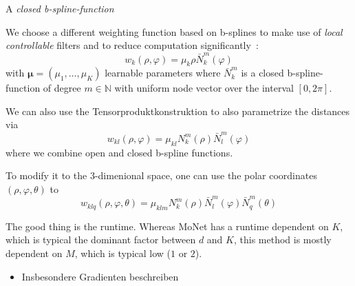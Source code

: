 \documentclass[pdftex,10pt,a4paper]{scrartcl}
\begin{document}
A \emph{closed b-spline-function}

We choose a different weighting function based on b-splines to make use of \emph{local controllable} filters and to reduce computation significantly~\cite{Fey2017}:
\begin{equation*}
  w_k(\rho, \varphi) = \mu_k \rho \bar{N}_k^m(\varphi)
\end{equation*}
with $\boldsymbol{\mu} = (\mu_1, \ldots, \mu_K )$ learnable parameters where $\bar{N}_k^m$ is a closed b-spline-function of degree $m \in \mathbb{N}$ with uniform node vector over the interval $[0, 2\pi]$.

We can also use the Tensorproduktkonstruktion to also parametrize the distances via
\begin{equation*}
  w_{kl}(\rho, \varphi) = \mu_{kl} N_k^m(\rho) \bar{N}_l^m(\varphi)
\end{equation*}
where we combine open and closed b-spline functions.

To modify it to the 3-dimenional space, one can use the polar coordinates $(\rho, \varphi, \theta)$ to
\begin{equation*}
  w_{klq}(\rho, \varphi, \theta) = \mu_{klm} N_k^m(\rho) \bar{N}_l^m(\varphi) \bar{N}_q^m(\theta)
\end{equation*}

The good thing is the runtime.
Whereas MoNet has a runtime dependent on $K$, which is typical the dominant factor between $d$ and $K$, this method is mostly dependent on $M$, which is typical low ($1$ or $2$).









\begin{itemize}
  \item Insbesondere Gradienten beschreiben
\end{itemize}



\end{document}
